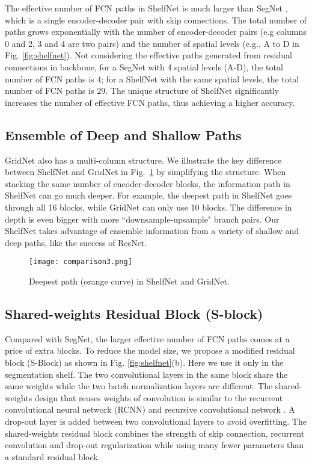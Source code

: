 \documentclass[10pt,twocolumn,letterpaper]{article}
\begin{document}
The effective number of FCN paths in ShelfNet is much larger than SegNet \cite{badrinarayanan2015segnet}, which is a single encoder-decoder pair with skip connections. The total number of paths grows exponentially with the number of encoder-decoder pairs (e.g columns 0 and 2, 3 and 4 are two pairs) and the number of spatial levels (e.g., A to D in Fig. \ref{fig:shelfnet}). Not considering the effective paths generated from residual connections in backbone, for a SegNet with 4 spatial levels (A-D), the total number of FCN paths is 4; for a ShelfNet with the same spatial levels, the total number of FCN paths is 29. The unique structure of ShelfNet significantly increases the number of effective FCN paths, thus achieving a higher accuracy.  

\subsection{Ensemble of Deep and Shallow Paths}

GridNet \cite{fourure2017residual} also has a multi-column structure. We illustrate the key difference between ShelfNet and GridNet in Fig.~\ref{fig:grid} by simplifying the structure. When stacking the same number of encoder-decoder blocks, the information path in ShelfNet can go much deeper. For example, the deepest path in ShelfNet goes through all 16 blocks, while GridNet can only use 10 blocks. The difference in depth is even bigger with more ``downsample-upsample" branch pairs. Our ShelfNet takes advantage of ensemble information from a variety of shallow and deep paths, like the success of ResNet.
\begin{figure}[h]
    \centering
    \texttt{[image: comparison3.png]}
    \caption{\small{Deepest path (orange curve) in ShelfNet and GridNet.}}
    \label{fig:grid}
\end{figure}
\subsection{Shared-weights Residual Block (S-block)}

Compared with SegNet, the larger effective number of FCN paths comes at a price of extra blocks. To reduce the model size, we propose a modified residual block (S-Block) as shown in Fig. \ref{fig:shelfnet}(b). Here we use it only in the segmentation shelf. The two convolutional layers in the same block share the same weights while the two batch normalization layers are different. The shared-weights design that reuses weights of convolution is similar to the recurrent convolutional neural network (RCNN) \cite{alom2017inception} and recursive convolutional network \cite{kim2016deeply}.  A drop-out layer is added between two convolutional layers to avoid overfitting. The shared-weights residual block combines the strength of skip connection, recurrent convolution and drop-out regularization while  using many fewer parameters than a standard residual block.
\end{document}
